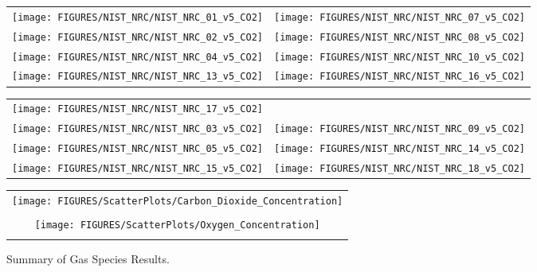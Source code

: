 \begin{figure}[p]
\begin{tabular*}{\textwidth}{l@{\extracolsep{\fill}}r}
\texttt{[image: FIGURES/NIST\_NRC/NIST\_NRC\_01\_v5\_CO2]} &
\texttt{[image: FIGURES/NIST\_NRC/NIST\_NRC\_07\_v5\_CO2]} \\
\texttt{[image: FIGURES/NIST\_NRC/NIST\_NRC\_02\_v5\_CO2]} &
\texttt{[image: FIGURES/NIST\_NRC/NIST\_NRC\_08\_v5\_CO2]} \\
\texttt{[image: FIGURES/NIST\_NRC/NIST\_NRC\_04\_v5\_CO2]} &
\texttt{[image: FIGURES/NIST\_NRC/NIST\_NRC\_10\_v5\_CO2]} \\
\texttt{[image: FIGURES/NIST\_NRC/NIST\_NRC\_13\_v5\_CO2]} &
\texttt{[image: FIGURES/NIST\_NRC/NIST\_NRC\_16\_v5\_CO2]}
\end{tabular*}
\end{figure}

\begin{figure}[p]
\begin{tabular*}{\textwidth}{l@{\extracolsep{\fill}}r}
\texttt{[image: FIGURES/NIST\_NRC/NIST\_NRC\_17\_v5\_CO2]} &
 \\
\texttt{[image: FIGURES/NIST\_NRC/NIST\_NRC\_03\_v5\_CO2]} &
\texttt{[image: FIGURES/NIST\_NRC/NIST\_NRC\_09\_v5\_CO2]} \\
\texttt{[image: FIGURES/NIST\_NRC/NIST\_NRC\_05\_v5\_CO2]} &
\texttt{[image: FIGURES/NIST\_NRC/NIST\_NRC\_14\_v5\_CO2]} \\
\texttt{[image: FIGURES/NIST\_NRC/NIST\_NRC\_15\_v5\_CO2]} &
\texttt{[image: FIGURES/NIST\_NRC/NIST\_NRC\_18\_v5\_CO2]}
\end{tabular*}
\end{figure}


\begin{figure}[p]
\begin{center}
\begin{tabular}{c}
\texttt{[image: FIGURES/ScatterPlots/Carbon\_Dioxide\_Concentration]} \\
\vspace{0.25in} \\
\texttt{[image: FIGURES/ScatterPlots/Oxygen\_Concentration]}\\
\vspace{0.25in}
\end{tabular}
\end{center}
\caption{Summary of Gas Species Results.}
\end{figure}

